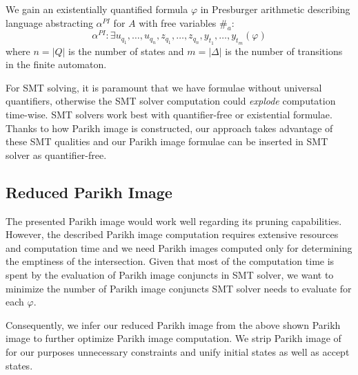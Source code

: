 We gain an existentially quantified formula $\varphi$ in Presburger arithmetic describing language abstracting $\alpha^{PI}$ for $A$ with free variables $\#_a$:
$$ \alpha^{PI} : \exists u_{q_1},\ldots,u_{q_n},z_{q_1},\ldots,z_{q_n},y_{t_1},\ldots,y_{t_m} ( \varphi ) $$
where $n = \lvert Q \rvert$ is the number of states and $m = \lvert \Delta \rvert$ is the number of transitions in the finite automaton.

For SMT solving, it is paramount that we have formulae without universal quantifiers, otherwise the SMT solver computation could \emph{explode} computation time-wise. SMT solvers work best with quantifier-free or existential formulae. Thanks to how Parikh image is constructed, our approach takes advantage of these SMT qualities and our Parikh image formulae can be inserted in SMT solver as quantifier-free.

\subsection{Reduced Parikh Image}\label{sec:reducedParikhImage}

The presented Parikh image would work well regarding its pruning capabilities. However, the described Parikh image computation requires extensive resources and computation time and we need Parikh images computed only for determining the emptiness of the intersection. Given that most of the computation time is spent by the evaluation of Parikh image conjuncts in SMT solver, we want to minimize the number of Parikh image conjuncts SMT solver needs to evaluate for each $\varphi$.

Consequently, we infer our reduced Parikh image from the above shown Parikh image to further optimize Parikh image computation. We strip Parikh image of for our purposes unnecessary constraints and unify initial states as well as accept states.


